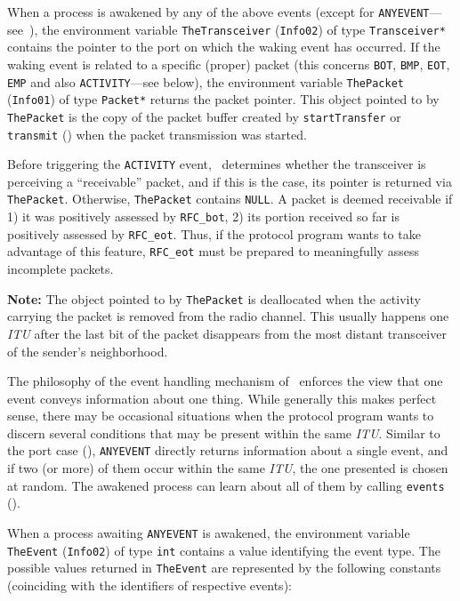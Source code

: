 When a process is awakened by any of the above events (except for
{\tt ANYEVENT}---see~),
the environment variable {\tt TheTransceiver} ({\tt Info02}) of type
{\tt Transceiver*} contains the pointer
to the port on which the waking event has occurred.
If the waking event is related to a specific (proper) packet
(this concerns {\tt BOT}, {\tt BMP}, {\tt EOT}, {\tt EMP} and also
{\tt ACTIVITY}---see below),
the environment variable {\tt ThePacket} ({\tt Info01}) of type {\tt Packet*}
returns the packet pointer.
This object pointed to by {\tt ThePacket} is the copy
of the packet buffer created by {\tt startTransfer}
or {\tt transmit} ()
when the packet transmission was started.

Before triggering the {\tt ACTIVITY} event, \smurph\ determines whether
the transceiver is perceiving a ``receivable'' packet, and if this is the
case, its pointer is returned via {\tt ThePacket}.
Otherwise, {\tt ThePacket} contains {\tt NULL}.
A packet is deemed receivable if 1) it was positively assessed by
{\tt RFC\_bot}, 2) its portion received so far is positively assessed by
{\tt RFC\_eot}.
Thus, if the protocol program wants to take advantage of this
feature, {\tt RFC\_eot} must be prepared to meaningfully assess
incomplete packets.

\medskip

\noindent
{\bf Note:}
The object pointed to by {\tt ThePacket} is deallocated when the activity
carrying the packet is removed from the radio channel.
This usually happens one {\em ITU\/} after the last bit of the packet
disappears from the most distant transceiver of the sender's neighborhood.

\medskip

The philosophy of the event handling mechanism of \smurph\ enforces the
view that one event conveys information about one thing.
While generally this makes perfect sense, there may be occasional situations
when the protocol program wants to discern several conditions that may
be present within the same {\em ITU}.
Similar to the port case (), {\tt ANYEVENT} directly returns
information about a single event, and if
two (or more) of them occur within the same {\em ITU}, the one presented
is chosen at random.
The awakened process can learn about all of them
by calling {\tt events} ().

When a process awaiting {\tt ANYEVENT} is awakened, the environment
variable {\tt TheEvent} ({\tt Info02}) of type {\tt int}
contains a value identifying the event type.
The possible values returned in {\tt TheEvent} are represented by the
following constants (coinciding with the identifiers of respective events):

